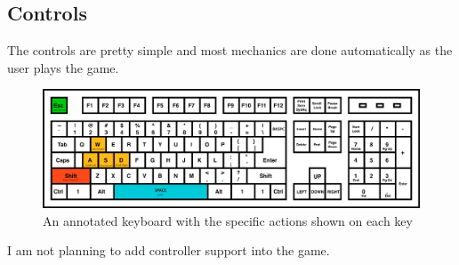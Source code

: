 \documentclass[12pt]{article}
\begin{document}
	\subsection{Controls}
	The controls are pretty simple and most mechanics are done automatically as the user plays the game.
	
	\begin{figure}[h]
		\includegraphics[scale=0.2]{keyboardLayout}
		\centering
		\caption{An annotated keyboard with the specific actions shown on each key}
	\end{figure}
	
	I am not planning to add controller support into the game.
	
\end{document}
